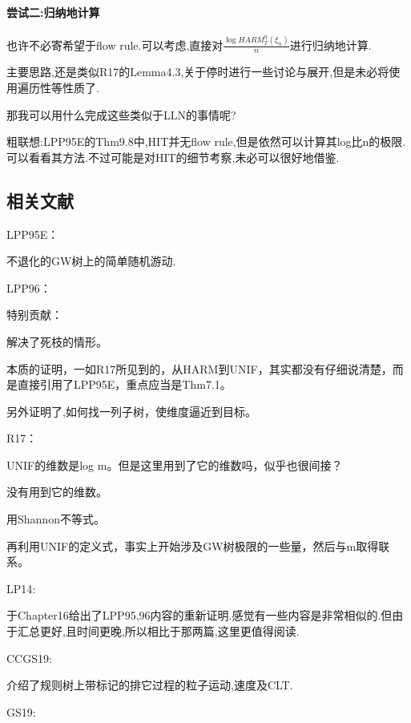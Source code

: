 \documentclass[a4paper,oneside]{ctexbook}
\begin{document}
			\paragraph*{尝试二:归纳地计算}
			\quad %

				也许不必寄希望于flow rule.可以考虑,直接对$\displaystyle\frac{\log HARM^{\eta}_T(\xi_n)}{n}$进行归纳地计算.

				主要思路,还是类似R17的Lemma4.3,关于停时进行一些讨论与展开,但是未必将使用遍历性等性质了.

				那我可以用什么完成这些类似于LLN的事情呢?

				粗联想:LPP95E的Thm9.8中,HIT并无flow rule,但是依然可以计算其log比n的极限.可以看看其方法.不过可能是对HIT的细节考察,未必可以很好地借鉴.

	
		\subsection*{相关文献}

			\qquad LPP95E\cite{LPP95E}：

				不退化的GW树上的简单随机游动.

			\qquad LPP96\cite{LPP96B}：

				特别贡献：

				解决了死枝的情形。

				本质的证明，一如R17所见到的，从HARM到UNIF，其实都没有仔细说清楚，而是直接引用了LPP95E，重点应当是Thm7.1。

				另外证明了,如何找一列子树，使维度逼近到目标。

			\qquad R17\cite{R17}：
				
				UNIF的维数是log m。但是这里用到了它的维数吗，似乎也很间接？

				没有用到它的维数。

				用Shannon不等式。

				再利用UNIF的定义式，事实上开始涉及GW树极限的一些量，然后与m取得联系。

			\qquad LP14\cite{LP14}:

				于Chapter16给出了LPP95,96内容的重新证明.感觉有一些内容是非常相似的.但由于汇总更好,且时间更晚,所以相比于那两篇,这里更值得阅读.

			\qquad CCGS19\cite{CCGS19}:

				介绍了规则树上带标记的排它过程的粒子运动,速度及CLT.

			\qquad GS19\cite{GS19}:
\end{document}
